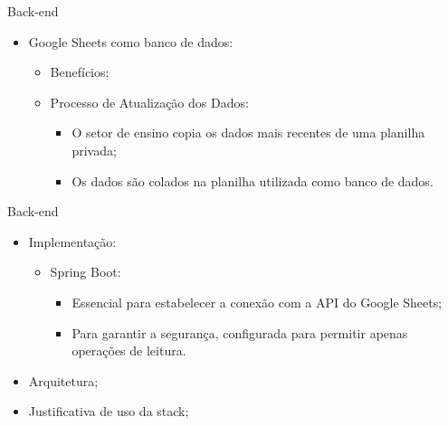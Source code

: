\begin{frame}{Back-end}
    \begin{itemize}
        \item Google Sheets como banco de dados: \vspace{0.5cm}
              \begin{itemize}
                  \item Benefícios; \vspace{0.5cm}
                  \item Processo de Atualização dos Dados: \vspace{0.5cm}
                        \begin{itemize}
                            \item O setor de ensino copia os dados mais recentes de uma planilha privada; \vspace{0.5cm}
                            \item Os dados são colados na planilha utilizada como banco de dados. \vspace{0.5cm}
                        \end{itemize}
              \end{itemize}
    \end{itemize}
\end{frame}

\begin{frame}{Back-end}
    \begin{itemize}
        \item Implementação: \vspace{0.5cm}
              \begin{itemize}
                  \item Spring Boot: \vspace{0.5cm}
                        \begin{itemize}
                            \item Essencial para estabelecer a conexão com a API do Google Sheets; \vspace{0.5cm}
                            \item Para garantir a segurança, configurada para permitir apenas operações de leitura. \vspace{0.5cm}
                        \end{itemize}
              \end{itemize}
        \item Arquitetura; \vspace{0.5cm}
        \item Justificativa de uso da stack; \vspace{0.5cm}
    \end{itemize}
\end{frame}

